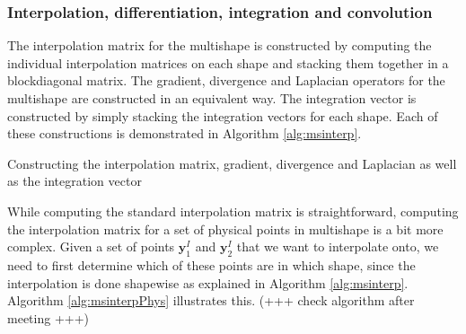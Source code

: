 \subsubsection{Interpolation, differentiation, integration and convolution}
The interpolation matrix for the multishape is constructed by computing the individual interpolation matrices on each shape and stacking them together in a blockdiagonal matrix. The gradient, divergence and Laplacian operators for the multishape are constructed in an equivalent way. The integration vector is constructed by simply stacking the integration vectors for each shape. Each of these constructions is demonstrated in Algorithm \ref{alg:msinterp}.

\begin{algorithm}[H]
	\SetAlgoLined
	\caption{Constructing the interpolation matrix, gradient, divergence and Laplacian as well as the integration vector}
	\label{alg:msinterp}
\end{algorithm}
While computing the standard interpolation matrix is straightforward, computing the interpolation matrix for a set of physical points in multishape is a bit more complex.
Given a set of points $\mathbf{y}_1^I$ and $\mathbf{y}_2^I$ that we want to interpolate onto, we need to first determine which of these points are in which shape, since the interpolation is done shapewise as explained in Algorithm \ref{alg:msinterp}. Algorithm \ref{alg:msinterpPhys} illustrates this. (+++ check algorithm after meeting +++)

